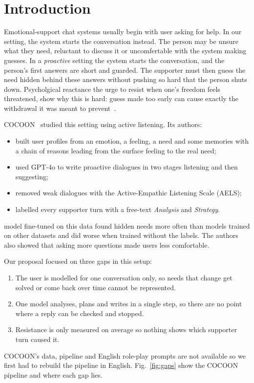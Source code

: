 \documentclass[journal]{IEEEtran}
\begin{document}
\section{Introduction}
Emotional-support chat systems usually begin with user asking for help. In our setting, the system starts the conversation instead. The person may be unsure what they need, reluctant to discuss it or uncomfertable with the system making guesses. In a \emph{proactive} setting the system starts the conversation, and the person's first answers are short and guarded. The supporter must then guess the need hidden behind these answers without pushing so hard that the person shuts down. Psycholgical reactance the urge to resist when one's freedom feels threatened, show why this is hard: guess made too early can cause exactly the withdrawal it was meant to prevent~\cite{dillard2005}.

COCOON~\cite{fu2025} studied this setting using active listening. Its authors:
\begin{itemize}
\item built user profiles from an emotion, a feeling, a need and some memories with a chain of reasons leading from the surface feeling to the real need;
\item used GPT-4o to write proactive dialogues in two stages listening and then suggesting;
\item removed weak dialogues with the Active-Empathic Listening Scale (AELS);
\item labelled every supporter turn with a free-text \emph{Analysis} and \emph{Strategy}.
\end{itemize}
model fine-tuned on this data found hidden needs more often than models trained on other datasets and did worse when trained without the labels. The authors also showed that asking more questions made users less comfortable.

Our proposal focused on three gaps in this setup:
\begin{enumerate}
\item The user is modelled for one conversation only, so needs that change get solved or come back over time cannot be represented.
\item One model analyses, plans and writes in a single step, so there are no point where a reply can be checked and stopped.
\item Resistance is only measured on average so nothing shows which supporter turn caused it.
\end{enumerate}
COCOON's data, pipeline and English role-play prompts are not available so we first had to rebuild the pipeline in English. Fig.~\ref{fig:gaps} show the COCOON pipeline and where each gap lies.
\end{document}
